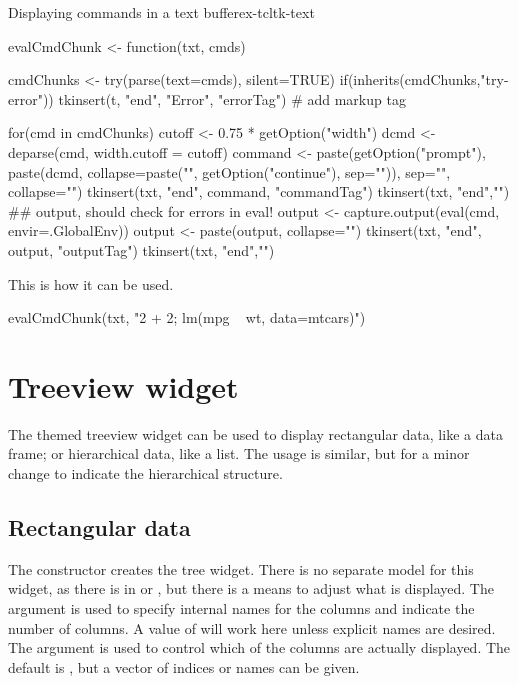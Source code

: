 \begin{example}{Displaying commands in a text buffer}{ex-tcltk-text}
\begin{Schunk}
\begin{Sinput}
 evalCmdChunk <- function(txt, cmds) {
   
   cmdChunks <- try(parse(text=cmds), silent=TRUE)
   if(inherits(cmdChunks,"try-error")) {
     tkinsert(t, "end", "Error", "errorTag") # add markup tag
   }
 
   for(cmd in cmdChunks) {
     cutoff <- 0.75 * getOption("width")
     dcmd <- deparse(cmd, width.cutoff = cutoff)
     command <- 
       paste(getOption("prompt"),
             paste(dcmd, collapse=paste("\n", 
                           getOption("continue"), sep="")),
             sep="", collapse="")
     tkinsert(txt, "end", command, "commandTag")
     tkinsert(txt, "end","\n")
     ## output, should check for errors in eval!
     output <- capture.output(eval(cmd, envir=.GlobalEnv))
     output <- paste(output, collapse="\n")
     tkinsert(txt, "end", output, "outputTag")
     tkinsert(txt, "end","\n")
   }
 }
\end{Sinput}
\end{Schunk}



This is how it can be used.
\begin{Schunk}
\begin{Sinput}
 evalCmdChunk(txt, "2 + 2; lm(mpg ~ wt, data=mtcars)")
\end{Sinput}
\end{Schunk}
\end{example}


\section{Treeview widget}
\label{sec:tcltk:treeview-widget}

The themed treeview widget can be used to display rectangular data,
like a data frame; or hierarchical data, like a list. The usage is
similar, but for a minor change to indicate the hierarchical structure.

\subsection{Rectangular data}


The  constructor creates the tree
widget. There is no separate model for this widget, as there is in
\GTK{} or \Qt, but there is a means to adjust what is displayed.  The
argument  is used to specify internal
names for the columns and indicate the number of columns. A value of
 will work here unless explicit names are desired. The
argument  is used to control
which of the columns are actually displayed. The default is
, but a vector of indices or names can be given.  


